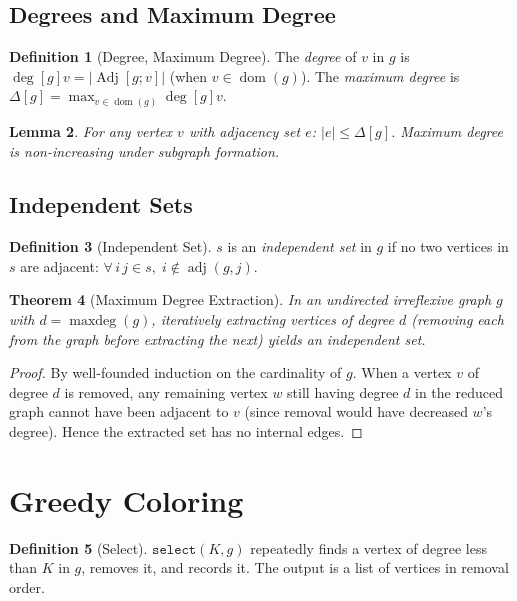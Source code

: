 \documentclass[11pt]{article}
\theoremstyle{plain}
\newtheorem{theorem}{Theorem}[section]
\newtheorem{lemma}[theorem]{Lemma}
\theoremstyle{definition}
\newtheorem{definition}[theorem]{Definition}
\theoremstyle{remark}
\newcommand{\adj}{\operatorname{adj}}
\newcommand{\Mdomain}{\operatorname{dom}}
\newcommand{\maxdeg}{\operatorname{maxdeg}}
\newcommand{\adjset}[2]{\operatorname{Adj}[#1;#2]}
\newcommand{\degreeof}[2]{\operatorname{deg}[#1]#2}
\newcommand{\maxdegreeof}[1]{\Delta[#1]}
\begin{document}
\subsection{Degrees and Maximum Degree}

\begin{definition}[Degree, Maximum Degree]
The \emph{degree} of $v$ in $g$ is $\degreeof{g}{v} = |\adjset{g}{v}|$ (when $v \in \Mdomain(g)$). The \emph{maximum degree} is $\maxdegreeof{g} = \max_{v \in \Mdomain(g)} \degreeof{g}{v}$.
\end{definition}

\begin{lemma}
For any vertex $v$ with adjacency set $e$: $|e| \le \maxdegreeof{g}$. Maximum degree is non-increasing under subgraph formation.
\end{lemma}

\subsection{Independent Sets}

\begin{definition}[Independent Set]
$s$ is an \emph{independent set} in $g$ if no two vertices in $s$ are adjacent: $\forall\, i\, j \in s,\; i \notin \adj(g, j)$.
\end{definition}

\begin{theorem}[Maximum Degree Extraction]
\label{thm:max-deg-extraction}
In an undirected irreflexive graph $g$ with $d = \maxdeg(g)$, iteratively extracting vertices of degree $d$ (removing each from the graph before extracting the next) yields an independent set.
\end{theorem}

\begin{proof}
By well-founded induction on the cardinality of $g$. When a vertex $v$ of degree $d$ is removed, any remaining vertex $w$ still having degree $d$ in the reduced graph cannot have been adjacent to $v$ (since removal would have decreased $w$'s degree). Hence the extracted set has no internal edges.
\end{proof}

\section{Greedy Coloring}
\label{sec:greedy}

\begin{definition}[Select]
$\texttt{select}(K, g)$ repeatedly finds a vertex of degree less than $K$ in $g$, removes it, and records it. The output is a list of vertices in removal order.
\end{definition}
\end{document}
